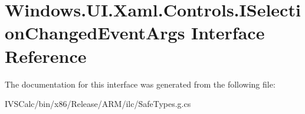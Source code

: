 \hypertarget{interface_windows_1_1_u_i_1_1_xaml_1_1_controls_1_1_i_selection_changed_event_args}{}\section{Windows.\+U\+I.\+Xaml.\+Controls.\+I\+Selection\+Changed\+Event\+Args Interface Reference}
\label{interface_windows_1_1_u_i_1_1_xaml_1_1_controls_1_1_i_selection_changed_event_args}


The documentation for this interface was generated from the following file\+:\begin{DoxyCompactItemize}
\item 
I\+V\+S\+Calc/bin/x86/\+Release/\+A\+R\+M/ilc/Safe\+Types.\+g.\+cs\end{DoxyCompactItemize}
